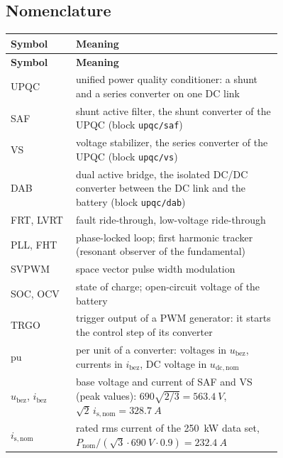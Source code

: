 \documentclass[11pt,a4paper]{scrartcl}
\newcommand{\ped}[1]{_{\mathrm{#1}}}
\newcommand{\code}[1]{\texttt{#1}}
\begin{document}


\tableofcontents
\listoffigures
\listoftables
\newpage

\begin{onehalfspace}

\section*{Nomenclature}
\label{sec:nomenclature}

\begingroup
{}
\begin{longtable}{@{} l p{0.76\linewidth} @{}}
	\toprule
	\textbf{Symbol} & \textbf{Meaning} \\
	\midrule
	\endfirsthead
	\toprule
	\textbf{Symbol} & \textbf{Meaning} \\
	\midrule
	\endhead
	\bottomrule
	\endfoot
	\bottomrule
	\endlastfoot
	UPQC & unified power quality conditioner: a shunt and a series converter on one DC link \\
	SAF & shunt active filter, the shunt converter of the UPQC (block \code{upqc/saf}) \\
	VS & voltage stabilizer, the series converter of the UPQC (block \code{upqc/vs}) \\
	DAB & dual active bridge, the isolated DC/DC converter between the DC link and the battery (block \code{upqc/dab}) \\
	FRT, LVRT & fault ride-through, low-voltage ride-through \\
	PLL, FHT & phase-locked loop; first harmonic tracker (resonant observer of the fundamental) \\
	SVPWM & space vector pulse width modulation \\
	SOC, OCV & state of charge; open-circuit voltage of the battery \\
	TRGO & trigger output of a PWM generator: it starts the control step of its converter \\
	pu & per unit of a converter: voltages in $u\ped{bez}$, currents in $i\ped{bez}$, DC voltage in $u\ped{dc,nom}$ \\
	$u\ped{bez}$, $i\ped{bez}$ & base voltage and current of SAF and VS (peak values): $690\sqrt{2/3} = \SI{563.4}{V}$, $\sqrt{2}\,i\ped{s,nom} = \SI{328.7}{A}$ \\
	$i\ped{s,nom}$ & rated rms current of the \SI{250}{\kilo\watt} data set, $P\ped{nom}/(\sqrt{3}\cdot\SI{690}{V}\cdot 0.9) = \SI{232.4}{A}$ \\

\end{longtable}
\end{onehalfspace}
\end{document}
